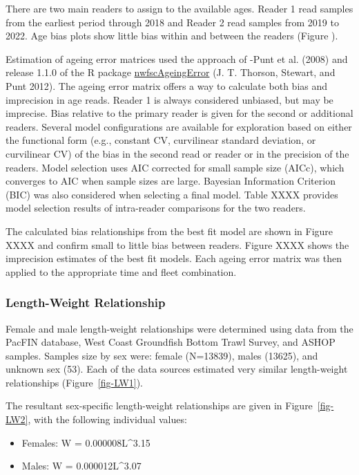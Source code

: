 \documentclass[
]{scrartcl}
\providecommand{\tightlist}{%
  \setlength{\itemsep}{0pt}\setlength{\parskip}{0pt}}\usepackage{longtable,booktabs,array}
\begin{document}
There are two main readers to assign to the available ages. Reader 1
read samples from the earliest period through 2018 and Reader 2 read
samples from 2019 to 2022. Age bias plots show little bias within and
between the readers (Figure ).

Estimation of ageing error matrices used the approach of -Punt et al.
(2008) and release 1.1.0 of the R package
\href{https://github.com/pfmc-assessments/nwfscAgeingError}{nwfscAgeingError}
(J. T. Thorson, Stewart, and Punt 2012). The ageing error matrix offers
a way to calculate both bias and imprecision in age reads. Reader 1 is
always considered unbiased, but may be imprecise. Bias relative to the
primary reader is given for the second or additional readers. Several
model configurations are available for exploration based on either the
functional form (e.g., constant CV, curvilinear standard deviation, or
curvilinear CV) of the bias in the second read or reader or in the
precision of the readers. Model selection uses AIC corrected for small
sample size (AICc), which converges to AIC when sample sizes are large.
Bayesian Information Criterion (BIC) was also considered when selecting
a final model. Table XXXX provides model selection results of
intra-reader comparisons for the two readers.

The calculated bias relationships from the best fit model are shown in
Figure XXXX and confirm small to little bias between readers. Figure
XXXX shows the imprecision estimates of the best fit models. Each ageing
error matrix was then applied to the appropriate time and fleet
combination.

\subsubsection{Length-Weight
Relationship}\label{length-weight-relationship}

Female and male length-weight relationships were determined using data
from the PacFIN database, West Coast Groundfish Bottom Trawl Survey, and
ASHOP samples. Samples size by sex were: female (N=13839), males
(13625), and unknown sex (53). Each of the data sources estimated very
similar length-weight relationships (Figure~\ref{fig-LW1}).

The resultant sex-specific length-weight relationships are given in
Figure~\ref{fig-LW2}, with the following individual values:

\begin{itemize}
\tightlist
\item
  Females: W = 0.000008L\^{}3.15
\item
  Males: W = 0.000012L\^{}3.07
\end{itemize}
\end{document}
